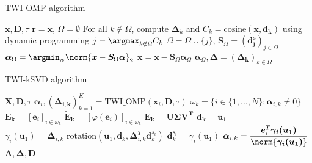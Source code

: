 \documentclass[11pt]{article}
\begin{document}
\begin{algorithm}
    \caption{TWI-OMP algorithm}\label{alg:twi_omp}
    \begin{algorithmic}
    \Require $\bm{x}, \bm{D}, \tau$
    \State $\bm{r} = \bm{x}$, $\Omega = \emptyset$
        \State For all $k \notin \Omega$, compute $\bm{\Delta}_k$ and $C_k = \text{cosine}(\bm{x}, \bm{d_k})$ using dynamic programming
        \State $j = \argmax_{k \notin \Omega} C_k$
        \State $\Omega = \Omega \cup \{ j \}$, $\bm{S}_{\Omega} = (\bm{d_j^s})_{j \in \Omega}$
        \State $\bm{\alpha}_{\Omega} = \argmin_{\bm{\alpha}} \norm{\bm{x} - \bm{S}_{\Omega}\bm{\alpha}}_2$
        \State $\bm{x} = \bm{x} - \bm{S}_{\Omega} \bm{\alpha}_{\Omega}$
    \EndFor
    \State \Return $\bm{\alpha}_{\Omega}, \bm{\Delta} = (\bm{\Delta_k})_{k \in \Omega}$
    \end{algorithmic}
\end{algorithm}

\begin{algorithm}
    \caption{TWI-kSVD algorithm}\label{alg:twi_ksvd}
    \begin{algorithmic}
    \Require $\bm{X}, \bm{D}, \tau$
            \State $\bm{\alpha}_i, (\bm{\Delta_{i, k}})_{k=1}^K = \text{TWI\_OMP}(\bm{x}_i, \bm{D}, \tau)$
        \EndFor
            \State $\omega_k = \{ i \in \{ 1, ..., N\} : \bm{\alpha}_{i, k} \neq 0 \}$
            \State $\bm{E_k} = [\bm{e}_i]_{i \in \omega_k}$
            \State $\bm{\tilde{E}_k} = [\varphi(\bm{e}_i)]_{i \in \omega_k}$
            \State $\bm{E_k} = \bm{U}\bm{\Sigma}\bm{V^T}$
            \State $\bm{d_k} = \bm{u}_1$
                \State $\gamma_i(\bm{u}_1) = \bm{\Delta}_{i, k} \text{ rotation}(\bm{u}_1, \bm{d}_k, \bm{\Delta}_{i, k}^T\bm{d}_k^{s_i})$
                \State $\bm{d}_k^{s_i} = \gamma_i(\bm{u}_1)$
                \State $\bm{\alpha}_{i, k} = \dfrac{\bm{e}_i^T \bm{\gamma_i(\bm{u}_1)}}{\norm{\bm{\gamma_i(\bm{u}_1)}}}$
            \EndFor
        \EndFor
    \EndFor
    \State \Return $\bm{A}, \bm{\Delta}, \bm{D}$
    \end{algorithmic}
\end{algorithm}
\end{document}
